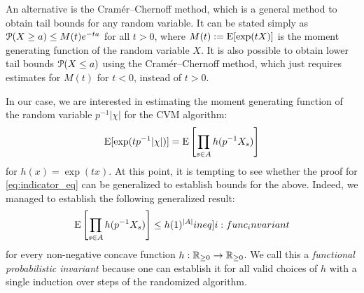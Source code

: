An alternative is the Cram\'{e}r--Chernoff method, which is a general method to obtain tail bounds for any random variable.
It can be stated simply as $\operatorname{\mathcal P}(X \geq a) \leq M(t) e^{-ta}$ for all $t > 0$, where $M(t) := \operatorname{\mathrm{E}} [\exp(t X)]$ is the moment generating function of the random variable $X$.
It is also possible to obtain lower tail bounds $\operatorname{\mathcal P}(X \leq a)$ using the Cram\'{e}r--Chernoff method, which just requires estimates for $M(t)$ for $t < 0$, instead of $t > 0$.

In our case, we are interested in estimating the moment generating function of the random variable $p^{-1} |\chi|$ for the CVM algorithm:
\[
  \operatorname{\mathrm{E}} [\exp( t p^{-1} |\chi| )] = \operatorname{\mathrm{E}} \left[ \prod_{s \in A} h(p^{-1} X_s) \right]
\]
for $h(x) = \exp(tx)$.
At this point, it is tempting to see whether the proof for \cref{eq:indicator_eq} can be generalized to establish bounds for the above.
Indeed, we managed to establish the following generalized result:
\begin{align}
  \expect \left[ \prod_{s \in A} h(p^{-1} X_s) \right] \leq h(1)^{|A|} \label[ineq]{i:func_invariant}
\end{align}
for every non-negative concave function $h : \operatorname{\mathbb R_{\geq 0}} \rightarrow \operatorname{\mathbb R_{\geq 0}}$.
We call this a \emph{functional probabilistic invariant} because one can establish it for all valid choices of $h$ with a single induction over steps of the randomized algorithm.

